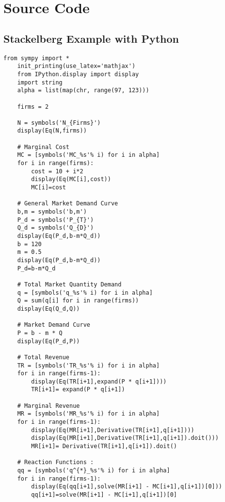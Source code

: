 
\chapter{Source Code} %

\label{AppendixA} %

\section{Stackelberg Example with Python}

\lstset{language=python}          %
\begin{lstlisting}[frame=single]  % Start your code-block
    from sympy import * 
    init_printing(use_latex='mathjax')
    from IPython.display import display
    import string
    alpha = list(map(chr, range(97, 123)))
    
    firms = 2
    
    N = symbols('N_{Firms}')
    display(Eq(N,firms))
    
    # Marginal Cost
    MC = [symbols('MC_%s'% i) for i in alpha]
    for i in range(firms):
        cost = 10 + i*2
        display(Eq(MC[i],cost))
        MC[i]=cost
    
    # General Market Demand Curve
    b,m = symbols('b,m')
    P_d = symbols('P_{T}')
    Q_d = symbols('Q_{D}')
    display(Eq(P_d,b-m*Q_d))
    b = 120
    m = 0.5
    display(Eq(P_d,b-m*Q_d))
    P_d=b-m*Q_d
    
    # Total Market Quantity Demand
    q = [symbols('q_%s'% i) for i in alpha]
    Q = sum(q[i] for i in range(firms))
    display(Eq(Q_d,Q))
    
    # Market Demand Curve
    P = b - m * Q
    display(Eq(P_d,P))
    
    # Total Revenue
    TR = [symbols('TR_%s'% i) for i in alpha]
    for i in range(firms-1):
        display(Eq(TR[i+1],expand(P * q[i+1])))
        TR[i+1]= expand(P * q[i+1])
    
    # Marginal Revenue
    MR = [symbols('MR_%s'% i) for i in alpha]
    for i in range(firms-1):
        display(Eq(MR[i+1],Derivative(TR[i+1],q[i+1])))
        display(Eq(MR[i+1],Derivative(TR[i+1],q[i+1]).doit()))
        MR[i+1]= Derivative(TR[i+1],q[i+1]).doit()
    
    # Reaction Functions :
    qq = [symbols('q^{*}_%s'% i) for i in alpha]
    for i in range(firms-1):
        display(Eq(qq[i+1],solve(MR[i+1] - MC[i+1],q[i+1])[0]))
        qq[i+1]=solve(MR[i+1] - MC[i+1],q[i+1])[0]
    

\end{lstlisting}
